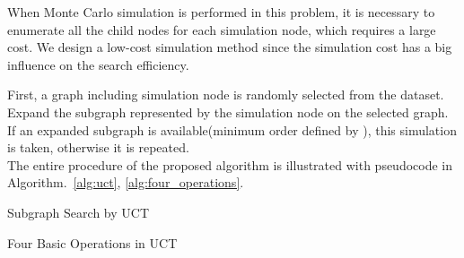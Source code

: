 When Monte Carlo simulation is performed in this problem, 
it is necessary to enumerate all the child nodes for each simulation node, which requires a large cost.
We design a low-cost simulation method 
since the simulation cost has a big influence on the search efficiency.

First, a graph including simulation node is randomly selected from the dataset.
Expand the subgraph represented by the simulation node on the selected graph.
If an expanded subgraph is available(minimum order defined by \cite{Yan:2002}), 
this simulation is taken, otherwise it is repeated. \\

The entire procedure of the proposed algorithm is illustrated with pseudocode in 
Algorithm.~\ref{alg:uct}, \ref{alg:four_operations}.\\

\begin{algorithm2e}[H]
  \caption{Subgraph Search by UCT}
  \label{alg:uct}
\end{algorithm2e}

\begin{algorithm2e}[H]
  \caption{Four Basic Operations in UCT}
  \label{alg:four_operations}
\end{algorithm2e}
